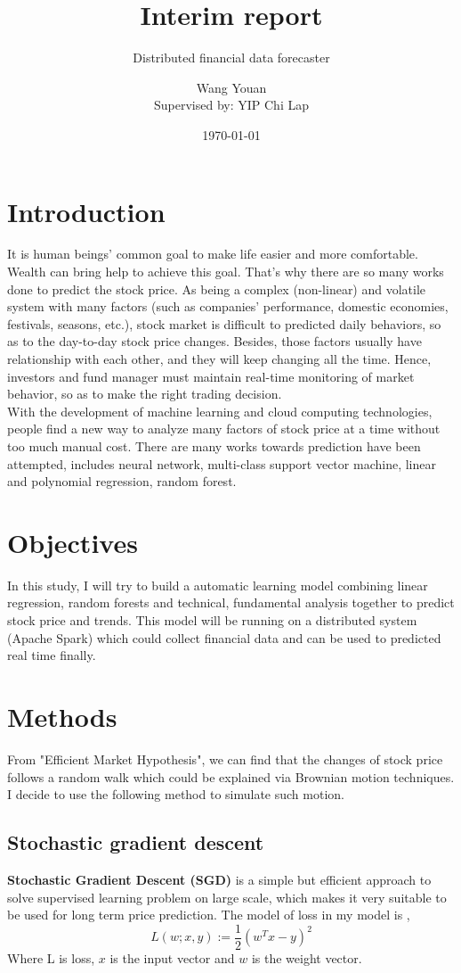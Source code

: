 \documentclass[12pt,a4paper]{scrartcl}
\title{Interim report}
\subtitle{Distributed financial data forecaster}
\author{Wang Youan\\{\small Supervised by: YIP Chi Lap}}
\date{\today}
\begin{document}
	\maketitle
	\section{Introduction}
	It is human beings' common goal to make life easier and more comfortable. Wealth can bring help to achieve this goal. That's why there are so many works done to predict the stock price. As being a complex (non-linear) and volatile system with many factors (such as companies' performance, domestic economies, festivals, seasons, etc.)\cite{chen1986economic}, stock market is difficult to predicted daily behaviors, so as to the day-to-day stock price changes. Besides, those factors usually have relationship with each other, and they will keep changing all the time. Hence, investors and fund manager must maintain real-time monitoring of market behavior, so as to make the right trading decision.\\
	\indent With the development of machine learning and cloud computing technologies, people find a new way to analyze many factors of stock price at a time without too much manual cost. There are many works towards prediction have been attempted, includes neural network\cite{kimoto1990stock,naeini2010stock}, multi-class support vector machine\cite{kercheval2015modelling}, linear and polynomial regression\cite{nunnostock,alexanderstock}, random forest\cite{alexanderstock,lauretto2013evaluation}.
	\section{Objectives}
	In this study, I will try to build a automatic learning model combining linear regression, random forests and technical, fundamental analysis together to predict stock price and trends. This model will be running on a distributed system (Apache Spark\cite{apache_spark}) which could collect financial data and can be used to predicted real time finally.
	\section{Methods}
	From "Efficient Market Hypothesis"\cite{basu1977investment,sewell2011history,vacha2005dynamical}, we can find that the changes of stock price follows a random walk which could be explained via Brownian motion techniques. I decide to use the following method to simulate such motion.
	\subsection{Stochastic gradient descent}
	\textbf{Stochastic Gradient Descent (SGD)} is a simple but efficient approach to solve supervised learning problem on large scale\cite{bottou2010large}, which makes it very suitable to be used for long term price prediction. The model of loss in my model is \cite{spark_documentation},
	\begin{equation}
		\label{eq:SGD}
		L(w;x,y):=\frac{1}{2}(w^Tx-y)^2
	\end{equation}
	Where L is loss, $ x $ is the input vector and $ w $ is the weight vector.
\end{document}
